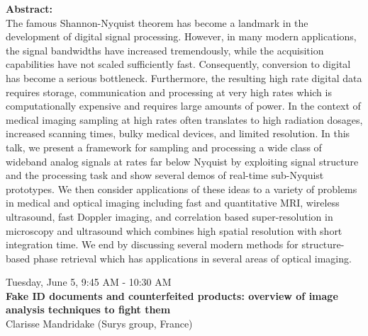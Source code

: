 \textbf{Abstract:}\\

The famous Shannon-Nyquist theorem has become a landmark in the development of digital signal processing. However, in many modern applications, the signal bandwidths have increased tremendously, while the acquisition capabilities have not scaled sufficiently fast. Consequently, conversion to digital has become a serious bottleneck.  Furthermore, the resulting high rate digital data requires storage, communication and processing at very high rates which is computationally expensive and requires large amounts of power.  In the context of medical imaging sampling at high rates often translates to high radiation dosages, increased scanning times, bulky medical devices, and limited resolution.
In this talk, we present a framework for sampling and processing a wide class of wideband analog signals at rates far below Nyquist by exploiting signal structure and the processing task and show several demos of real-time sub-Nyquist prototypes. We then consider applications of these ideas to a variety of problems in medical and optical imaging including fast and quantitative MRI, wireless ultrasound,  fast Doppler imaging, and correlation based super-resolution in microscopy and ultrasound which combines high spatial resolution with short integration time. We end by discussing several modern methods for structure-based phase retrieval which has applications in several areas of optical imaging.  


\newpage\vspace{2cm}
\begin{center}{\Large{
      Tuesday, June 5, 9:45 AM - 10:30 AM \\
      \textbf{Fake ID documents and counterfeited products: overview of image analysis techniques to fight them}\\
      Clarisse Mandridake (Surys group, France)  
}}
\end{center}
\vspace{1cm}

\begin{wrapfloat}{figure}{o}{0pt}
  \texttt{[image: \{images/speakers/c.mandridake@surys.com]}.jpg}
\end{wrapfloat}

